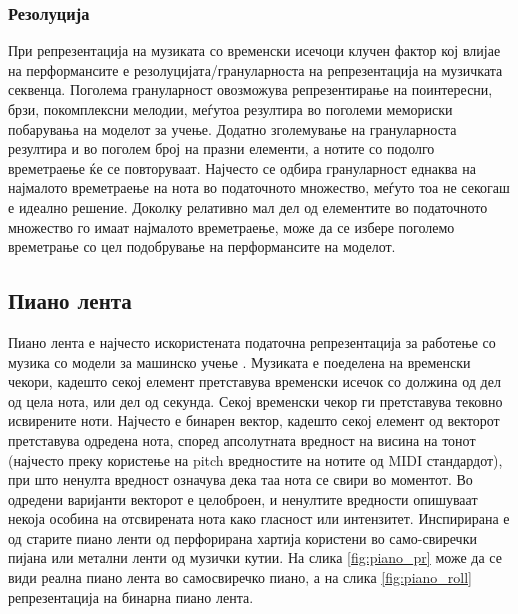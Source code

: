 \subsubsection{Резолуција}

При репрезентација на музиката со временски исечоци клучен фактор кој влијае на перформансите е резолуцијата/грануларноста на репрезентација на музичката секвенца. Поголема грануларност овозможува репрезентирање на поинтересни, брзи, покомплексни мелодии, меѓутоа резултира во поголеми мемориски побарувања на моделот за учење. Додатно зголемување на грануларноста резултира и во поголем број на празни елементи, а нотите со подолго времетраење ќе се повторуваат. Најчесто се одбира грануларност еднаква на најмалото времетраење на нота во податочното множество, меѓуто тоа не секогаш е идеално решение. Доколку релативно мал дел од елементите во податочното множество го имаат најмалото времетраење, може да се избере поголемо времетрање со цел подобрување на перформансите на моделот.

\subsection{Пиано лента}

Пиано лента е најчесто искористената податочна репрезентација за работење со музика со модели за машинско учење \cite{Hadjeres2016,Boulanger-Lewandowski2012,Boulanger-Lewandowski2014,Eck2002,Eck2008,Walder2016,Dong2017,Dong2018}. Музиката е поеделена на временски чекори, кадешто секој елемент претставува временски исечок со должина од дел од цела нота, или дел од секунда. Секој временски чекор ги претставува тековно исвирените ноти. Најчесто е бинарен вектор, кадешто секој елемент од векторот претставува одредена нота, според апсолутната вредност на висина на тонот (најчесто преку користење на pitch вредностите на нотите од MIDI стандардот), при што ненулта вредност означува дека таа нота се свири во моментот. Во одредени варијанти векторот е целоброен, и ненултите вредности опишуваат некоја особина на отсвирената нота како гласност или интензитет. Инспирирана е од старите пиано ленти од перфорирана хартија користени во само-свиречки пијана или метални ленти од музички кутии. На слика \ref{fig:piano_pr} може да се види реална пиано лента во самосвиречко пиано, а на слика \ref{fig:piano_roll} репрезентација на бинарна пиано лента.


